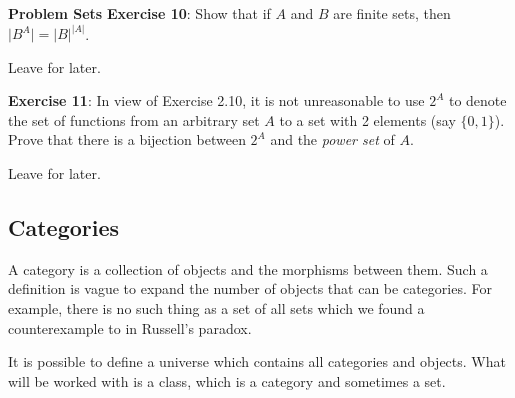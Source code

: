 \documentclass{report}
\begin{document}
\begin{exercises}{\textbf{Problem Sets}}
    \textbf{Exercise 10}: Show that if $A$ and $B$ are finite sets, then $\lvert B^{A} \rvert = \lvert B \rvert^{\lvert A \rvert}$.
        \begin{answer}
            Leave for later.
        \end{answer}

    \textbf{Exercise 11}: In view of Exercise 2.10, it is not unreasonable to use $2^{A}$ to denote the set of functions from an arbitrary set $A$ to a set with 2 elements (say $\{0, 1\}$). Prove that there is a bijection between $2^{A}$ and the \textit{power set} of $A$.
        \begin{answer}
            Leave for later.
        \end{answer}
\end{exercises}

\newpage
\begin{topic}
    \section{Categories}
\end{topic}

A category is a collection of objects and the morphisms between them. Such a definition is vague to expand the number of objects that can be categories. For example, there is no such thing as a set of all sets which we found a counterexample to in Russell's paradox. 

It is possible to define a universe which contains all categories and objects. What will be worked with is a class, which is a category and sometimes a set.
\end{document}
